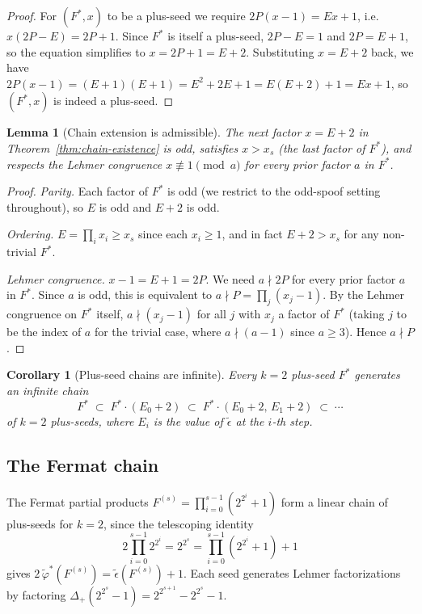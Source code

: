 \documentclass[11pt]{article}
\newtheorem{corollary}[theorem]{Corollary}
\newtheorem{lemma}[theorem]{Lemma}
\theoremstyle{definition}
\theoremstyle{remark}
\newcommand{\eps}{\tilde{\epsilon}}
\newcommand{\phist}{\tilde{\varphi}^*}
\begin{document}
\begin{proof}
For $(F^*, x)$ to be a plus-seed we require $2 P (x - 1) = E x + 1$,
i.e.\ $x(2P - E) = 2P + 1$.  Since $F^*$ is itself a plus-seed,
$2P - E = 1$ and $2P = E + 1$, so the equation simplifies to
$x = 2P + 1 = E + 2$.  Substituting $x = E + 2$ back, we have
$2P(x - 1) = (E+1)(E+1) = E^2 + 2E + 1 = E(E+2) + 1 = Ex + 1$, so
$(F^*, x)$ is indeed a plus-seed.
\end{proof}

\begin{lemma}[Chain extension is admissible]\label{lem:chain-admissible}
The next factor $x = E + 2$ in Theorem~\ref{thm:chain-existence} is
odd, satisfies $x > x_s$ (the last factor of $F^*$), and respects the
Lehmer congruence $x \not\equiv 1 \pmod{a}$ for every prior factor
$a$ in $F^*$.
\end{lemma}

\begin{proof}
\emph{Parity.}  Each factor of $F^*$ is odd (we restrict to the odd-spoof
setting throughout), so $E$ is odd and $E + 2$ is odd.

\emph{Ordering.}  $E = \prod_i x_i \ge x_s$ since each $x_i \ge 1$, and
in fact $E + 2 > x_s$ for any non-trivial $F^*$.

\emph{Lehmer congruence.}  $x - 1 = E + 1 = 2P$.  We need $a \nmid 2P$
for every prior factor $a$ in $F^*$.  Since $a$ is odd, this is
equivalent to $a \nmid P = \prod_j (x_j - 1)$.  By the Lehmer
congruence on $F^*$ itself, $a \nmid (x_j - 1)$ for all $j$ with
$x_j$ a factor of $F^*$ (taking $j$ to be the index of $a$ for the
trivial case, where $a \nmid (a-1)$ since $a \ge 3$).  Hence $a \nmid
P$.
\end{proof}

\begin{corollary}[Plus-seed chains are infinite]\label{cor:infinite-chain}
Every $k = 2$ plus-seed $F^*$ generates an infinite chain
\[
  F^* \;\subset\; F^* \cdot (E_0 + 2)
       \;\subset\; F^* \cdot (E_0 + 2,\, E_1 + 2)
       \;\subset\; \cdots
\]
of $k = 2$ plus-seeds, where $E_i$ is the value of $\eps$ at the
$i$-th step.
\end{corollary}

\subsection{The Fermat chain}

The Fermat partial products $F^{(s)} = \prod_{i=0}^{s-1}(2^{2^i}+1)$
form a linear chain of plus-seeds for $k = 2$, since the telescoping
identity
\[
  2\prod_{i=0}^{s-1} 2^{2^i}
    = 2^{2^s}
    = \prod_{i=0}^{s-1}(2^{2^i}+1) + 1
\]
gives $2\,\phist(F^{(s)}) = \eps(F^{(s)}) + 1$.  Each seed generates
Lehmer factorizations by factoring
$\Delta_+(2^{2^s}\!-\!1) = 2^{2^{s+1}} - 2^{2^s} - 1$.
\end{document}
